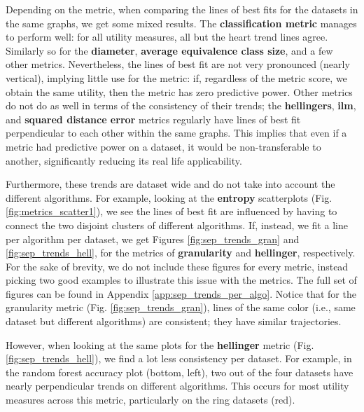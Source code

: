 Depending on the metric, when comparing the lines of best fits for the datasets in the same graphs, we get some mixed results. The \textbf{classification metric} manages to perform well: for all utility measures, all but the heart trend lines agree. Similarly so for the \textbf{diameter}, \textbf{average equivalence class size}, and a few other metrics. Nevertheless, the lines of best fit are not very pronounced (nearly vertical), implying little use for the metric: if, regardless of the metric score, we obtain the same utility, then the metric has zero predictive power. Other metrics do not do as well in terms of the consistency of their trends; the \textbf{hellingers}, \textbf{ilm}, and \textbf{squared distance error} metrics regularly have lines of best fit perpendicular to each other within the same graphs. This implies that even if a metric had predictive power on a dataset, it would be non-transferable to another, significantly reducing its real life applicability.

Furthermore, these trends are dataset wide and do not take into account the different algorithms. For example, looking at the \textbf{entropy} scatterplots (Fig. \ref{fig:metrics_scatter1}), we see the lines of best fit are influenced by having to connect the two disjoint clusters of different algorithms. If, instead, we fit a line per algorithm per dataset, we get Figures \ref{fig:sep_trends_gran} and \ref{fig:sep_trends_hell}, for the metrics of \textbf{granularity} and \textbf{hellinger}, respectively. For the sake of brevity, we do not include these figures for every metric, instead picking two good examples to illustrate this issue with the metrics. The full set of figures can be found in Appendix \ref{app:sep_trends_per_algo}. Notice that for the granularity metric (Fig. \ref{fig:sep_trends_gran}), lines of the same color (i.e., same dataset but different algorithms) are consistent; they have similar trajectories. 

However, when looking at the same plots for the \textbf{hellinger} metric (Fig. \ref{fig:sep_trends_hell}), we find a lot less consistency per dataset. For example, in the random forest accuracy plot (bottom, left), two out of the four datasets have nearly perpendicular trends on different algorithms. This occurs for most utility measures across this metric, particularly on the ring datasets (red).


